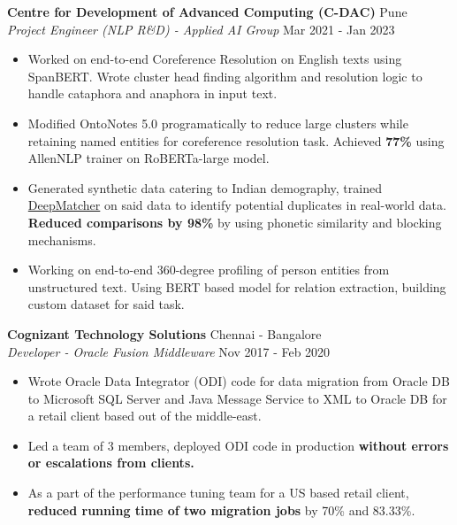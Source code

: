 \documentclass[a4paper]{article}
\begin{document}
\vspace{1mm}
\textbf{Centre for Development of Advanced Computing (C-DAC)} \hfill Pune\\
\textit{Project Engineer (NLP R\&D) - Applied AI Group} \hfill Mar 2021 - Jan 2023\\
\vspace{-1mm}
\begin{itemize} \itemsep 1pt
    \item Worked on end-to-end Coreference Resolution on English texts using SpanBERT. Wrote cluster head finding algorithm and resolution logic to handle cataphora and anaphora in input text.
    \item Modified OntoNotes 5.0 programatically to reduce large clusters while retaining named entities for coreference resolution task. Achieved \textbf{77\%} using AllenNLP trainer on RoBERTa-large model.
    \item Generated synthetic data catering to Indian demography, trained \href{https://github.com/anhaidgroup/deepmatcher}{DeepMatcher} on said data to identify potential duplicates in real-world data. \textbf{Reduced comparisons by 98\%} by using phonetic similarity and blocking mechanisms.
    \item Working on end-to-end 360-degree profiling of person entities from unstructured text. Using BERT based model for relation extraction, building custom dataset for said task.
\end{itemize}

\vspace*{2mm}

\textbf{Cognizant Technology Solutions} \hfill Chennai - Bangalore\\
\textit{Developer - Oracle Fusion Middleware} \hfill Nov 2017 - Feb 2020\\
\vspace{-1mm}
\begin{itemize} \itemsep 1pt
    \item Wrote Oracle Data Integrator (ODI) code for data migration from Oracle DB to Microsoft SQL Server and Java Message Service to XML to Oracle DB for a retail client based out of the middle-east.
    \item Led a team of 3 members, deployed ODI code in production \textbf{without errors or escalations from clients.}
    \item As a part of the performance tuning team for a US based retail client, \textbf{reduced running time of two migration jobs} by 70\% and 83.33\%.
\end{itemize}
\end{document}
